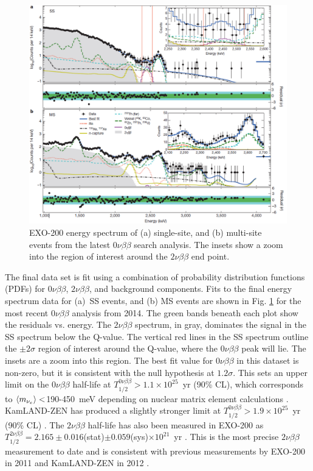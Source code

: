 \begin{figure} %
	\centering
	\includegraphics[width=.95\textwidth]{figures/0nu_spectrum_nature.png}
	\caption{EXO-200 energy spectrum of (a) single-site, and (b) multi-site events from the latest $0\nu\beta\beta$ search analysis.  The insets show a zoom into the region of interest around the $2\nu\beta\beta$ end point. \cite{EXO2000nuNature}}
\label{fig:exo200data}
\end{figure}

The final data set is fit using a combination of probability distribution functions (PDFs) for $0\nu\beta\beta$, $2\nu\beta\beta$, and background components.  Fits to the final energy spectrum data for (a)~SS events, and (b) MS events are shown in Fig. \ref{fig:exo200data} for the most recent $0\nu\beta\beta$ analysis from 2014.  The green bands beneath each plot show the residuals vs. energy.  The $2\nu\beta\beta$ spectrum, in gray, dominates the signal in the SS spectrum below the Q-value.  The vertical red lines in the SS spectrum outline the $\pm 2 \sigma$ region of interest around the Q-value, where the $0\nu\beta\beta$ peak will lie.  The insets are a zoom into this region.  The best fit value for $0\nu\beta\beta$ in this dataset is non-zero, but it is consistent with the null hypothesis at $1.2 \sigma$.  This sets an upper limit on the $0\nu\beta\beta$ half-life at $T^{0\nu\beta\beta}_{1/2} > 1.1 \times 10^{25}$~yr (90\% CL), which corresponds to $\braket{m_{\nu_{e}}} < $190-450~meV depending on nuclear matrix element calculations \cite{EXO2000nuNature}.  KamLAND-ZEN has produced a slightly stronger limit at $T^{0\nu\beta\beta}_{1/2} > 1.9 \times 10^{25}$~yr (90\% CL) \cite{KamLAND0nu}.  The $2\nu\beta\beta$ half-life has also been measured in EXO-200 as $T^{2\nu\beta\beta}_{1/2} = 2.165 \pm 0.016$(stat)$ \pm 0.059$(sys)$ \times 10^{21}$~yr \cite{EXO200TwoNuLong}.  This is the most precise $2\nu\beta\beta$ measurement to date and is consistent with previous measurements by EXO-200 in 2011 \cite{EXO200TwoNuOriginal} and KamLAND-ZEN in 2012 \cite{KamLAND2nu}.

